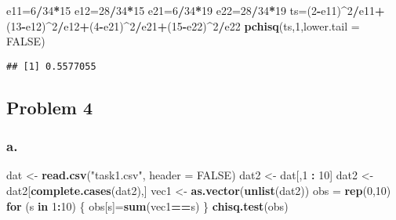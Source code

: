 \documentclass[]{article}
\newenvironment{Shaded}{\begin{snugshade}}{\end{snugshade}}
\newcommand{\KeywordTok}[1]{\textcolor[rgb]{0.13,0.29,0.53}{\textbf{#1}}}
\newcommand{\DataTypeTok}[1]{\textcolor[rgb]{0.13,0.29,0.53}{#1}}
\newcommand{\DecValTok}[1]{\textcolor[rgb]{0.00,0.00,0.81}{#1}}
\newcommand{\StringTok}[1]{\textcolor[rgb]{0.31,0.60,0.02}{#1}}
\newcommand{\OtherTok}[1]{\textcolor[rgb]{0.56,0.35,0.01}{#1}}
\newcommand{\ControlFlowTok}[1]{\textcolor[rgb]{0.13,0.29,0.53}{\textbf{#1}}}
\newcommand{\OperatorTok}[1]{\textcolor[rgb]{0.81,0.36,0.00}{\textbf{#1}}}
\newcommand{\NormalTok}[1]{#1}
\begin{document}
\begin{Shaded}
\begin{Highlighting}[]
\NormalTok{e11=}\DecValTok{6}\OperatorTok{/}\DecValTok{34}\OperatorTok{*}\DecValTok{15}
\NormalTok{e12=}\DecValTok{28}\OperatorTok{/}\DecValTok{34}\OperatorTok{*}\DecValTok{15}
\NormalTok{e21=}\DecValTok{6}\OperatorTok{/}\DecValTok{34}\OperatorTok{*}\DecValTok{19}
\NormalTok{e22=}\DecValTok{28}\OperatorTok{/}\DecValTok{34}\OperatorTok{*}\DecValTok{19}
\NormalTok{ts=(}\DecValTok{2}\OperatorTok{-}\NormalTok{e11)}\OperatorTok{^}\DecValTok{2}\OperatorTok{/}\NormalTok{e11}\OperatorTok{+}\NormalTok{(}\DecValTok{13}\OperatorTok{-}\NormalTok{e12)}\OperatorTok{^}\DecValTok{2}\OperatorTok{/}\NormalTok{e12}\OperatorTok{+}\NormalTok{(}\DecValTok{4}\OperatorTok{-}\NormalTok{e21)}\OperatorTok{^}\DecValTok{2}\OperatorTok{/}\NormalTok{e21}\OperatorTok{+}\NormalTok{(}\DecValTok{15}\OperatorTok{-}\NormalTok{e22)}\OperatorTok{^}\DecValTok{2}\OperatorTok{/}\NormalTok{e22}
\KeywordTok{pchisq}\NormalTok{(ts,}\DecValTok{1}\NormalTok{,}\DataTypeTok{lower.tail =} \OtherTok{FALSE}\NormalTok{)}
\end{Highlighting}
\end{Shaded}

\begin{verbatim}
## [1] 0.5577055
\end{verbatim}

\subsection{Problem 4}\label{problem-4}

\subsubsection{a.}\label{a.-2}

\begin{Shaded}
\begin{Highlighting}[]
\NormalTok{dat <-}\StringTok{ }\KeywordTok{read.csv}\NormalTok{(}\StringTok{"task1.csv"}\NormalTok{, }\DataTypeTok{header =} \OtherTok{FALSE}\NormalTok{)}
\NormalTok{dat2 <-}\StringTok{ }\NormalTok{dat[,}\DecValTok{1} \OperatorTok{:}\StringTok{ }\DecValTok{10}\NormalTok{]}
\NormalTok{dat2 <-}\StringTok{ }\NormalTok{dat2[}\KeywordTok{complete.cases}\NormalTok{(dat2),]}
\NormalTok{vec1 <-}\StringTok{ }\KeywordTok{as.vector}\NormalTok{(}\KeywordTok{unlist}\NormalTok{(dat2))}
\NormalTok{obs =}\StringTok{ }\KeywordTok{rep}\NormalTok{(}\DecValTok{0}\NormalTok{,}\DecValTok{10}\NormalTok{)}
\ControlFlowTok{for}\NormalTok{ (s }\ControlFlowTok{in} \DecValTok{1}\OperatorTok{:}\DecValTok{10}\NormalTok{) \{}
\NormalTok{  obs[s]=}\KeywordTok{sum}\NormalTok{(vec1}\OperatorTok{==}\NormalTok{s)}
\NormalTok{\}}
\KeywordTok{chisq.test}\NormalTok{(obs)}
\end{Highlighting}
\end{Shaded}
\end{document}
